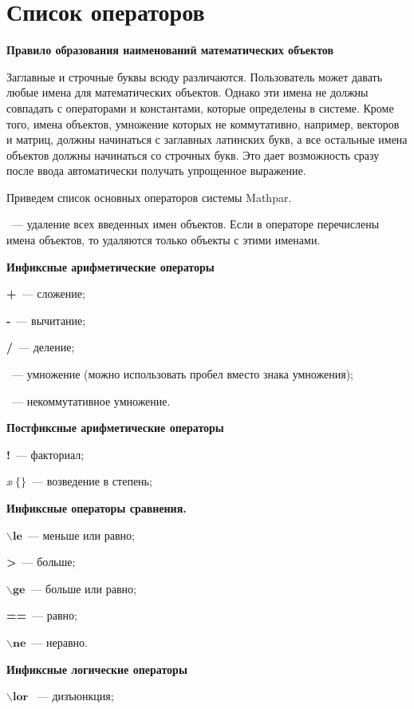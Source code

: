 \chapter{Список операторов}

{\bf Правило образования наименований математических объектов}
\bigskip

Заглавные и строчные буквы всюду различаются. Пользователь может давать любые имена для математических объектов. Однако эти имена не должны совпадать с операторами и константами, которые определены в системе. Кроме того, имена объектов, умножение которых  не коммутативно,  например,  векторов и матриц,  должны начинаться с заглавных латинских букв, а все остальные имена объектов должны начинаться со строчных букв. Это дает возможность сразу после ввода автоматически получать упрощенное выражение.
\bigskip

Приведем список основных операторов системы Mathpar.   

~---  удаление всех введенных имен объектов.  Если в операторе перечислены имена объектов,  то удаляются только объекты с этими именами. 
\bigskip

{\bf Инфиксные арифметические операторы}

{\bf +}~---   сложение;

{\bf -}~---  вычитание;

{\bf /}~---  деление;

{\bf *}~---  умножение (можно использовать пробел вместо знака умножения);

~--- некоммутативное умножение. 
\bigskip


\bigskip

{\bf Постфиксные арифметические операторы}


{\bf !}~---  факториал;

{ ${x} \widehat{\ }{\{ \}}$}~---  возведение в степень;
\bigskip

{\bf Инфиксные операторы сравнения.}


$\mathbf{\backslash le}$~---  меньше или равно;

{\bf >}~---  больше;

 $\mathbf{\backslash ge}$~--- больше или равно;

{\bf ==}~---   равно;

$\mathbf{\backslash ne}$~--- неравно. 
\bigskip

{\bf Инфиксные логические операторы}


 $\mathbf{ \backslash lor}$ ~--- дизъюнкция;

